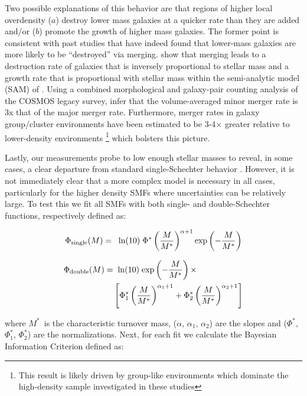 \documentclass[a4paper,fleqn,usenatbib]{mnras}
\def\mstar{$M^*$}
\begin{document}
\renewcommand{\thefootnote}{\fnsymbol{footnote}}
Two possible explanations of this behavior are that regions of higher local overdensity ($a$) destroy lower mass galaxies at a quicker rate than they are added and/or ($b$) promote the growth of higher mass galaxies.
The former point is consistent with past studies that have indeed found that lower-mass galaxies are more likely to be ``destroyed'' via merging.
\citet{Leja2015} show that merging leads to a destruction rate of galaxies that is inversely proportional to stellar mass and a growth rate that is proportional with stellar mass within the semi-analytic model (SAM) of \citet{Guo2013b}.
Using a combined morphological and galaxy-pair counting analysis of the COSMOS legacy survey, \citet{Lotz2011} infer that the volume-averaged minor merger rate is 3x that of the major merger rate.
Furthermore, merger rates in galaxy group/cluster environments have been estimated to be 3-4$\times$ greater relative to lower-density environments \citep{Lin2010, Kampczyk2013}\footnote[3]{This result is likely driven by group-like environments which dominate the high-density sample investigated in these studies} which bolsters this picture.
\renewcommand{\thefootnote}{\arabic{footnote}}


Lastly, our measurements probe to low enough stellar masses to reveal, in some cases, a clear departure from standard single-Schechter behavior \citep{Schechter1976}.
However, it is not immediately clear that a more complex model is necessary in all cases, particularly for the higher density SMFs where uncertainties can be relatively large.
To test this we fit all SMFs with both single- and double-Schechter functions, respectively defined as:


\begin{equation}
\Phi_{\rm{single}} (M) = \;\; \mathrm{ln} (10) \; \Phi^* \left( \frac{M}{M^*} \right)^{\alpha + 1} \mathrm{exp} \left( -\frac{M}{M^*} \right)
\end{equation}


\begin{equation}
\begin{split}
\Phi_{\rm{double}} (M) =& \;\; \mathrm{ln} (10) \; \mathrm{exp} \left( -\frac{M}{M^*} \right) \times \\
&\left[ \Phi^*_1 \left( \frac{M}{M^*} \right)^{\alpha_1 + 1}   +   \Phi^*_2 \left( \frac{M}{M^*} \right)^{\alpha_2 + 1}   \right]
\end{split}
\end{equation}


\noindent
where \mstar\ is the characteristic turnover mass, ($\alpha$, $\alpha_1$, $\alpha_2$) are the slopes and ($\Phi^*$, $\Phi^*_1$, $\Phi^*_2$) are the normalizations.  
Next, for each fit we calculate the Bayesian Information Criterion \citep[BIC:][]{Schwarz1978} defined as:
\end{document}
